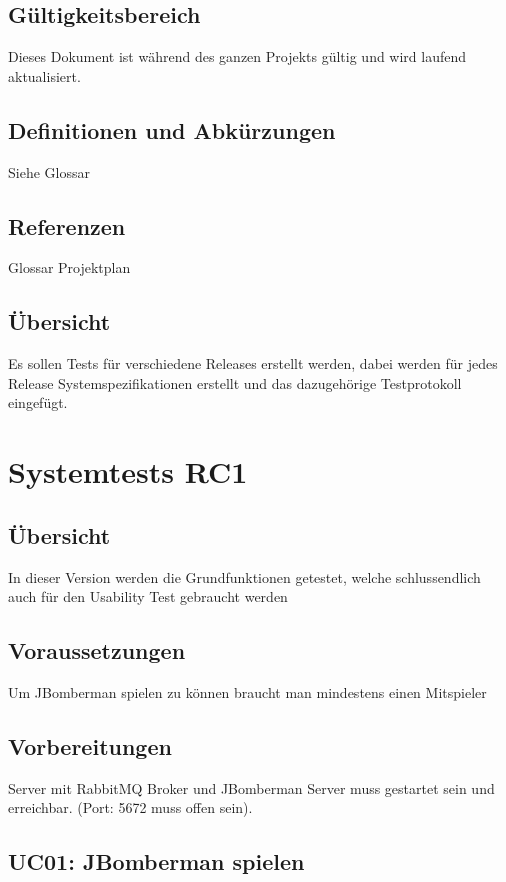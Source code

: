 \documentclass[11pt]{scrartcl}
\begin{document}
\subsection{Gültigkeitsbereich}
Dieses Dokument ist während des ganzen Projekts gültig und wird laufend aktualisiert.
\subsection{Definitionen und Abkürzungen}
Siehe Glossar
\subsection{Referenzen}
Glossar
Projektplan
\subsection{Übersicht}
Es sollen Tests für verschiedene Releases erstellt werden, dabei werden für 
jedes Release Systemspezifikationen erstellt und das dazugehörige Testprotokoll 
eingefügt.
\section{Systemtests RC1}
\subsection{Übersicht}
In dieser Version werden die Grundfunktionen getestet, welche schlussendlich auch 
für den Usability Test gebraucht werden
\subsection{Voraussetzungen}
Um JBomberman spielen zu können braucht man mindestens einen Mitspieler
\subsection{Vorbereitungen}
Server mit RabbitMQ Broker und JBomberman Server muss gestartet sein und 
erreichbar. 
(Port: 5672 muss offen sein).
\subsection{UC01: JBomberman spielen}
\end{document}
